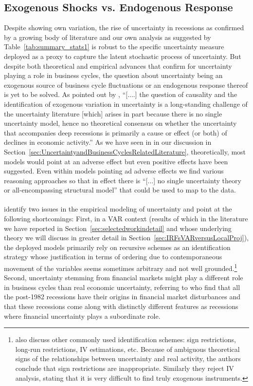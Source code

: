\documentclass[a4paper,11pt,listof=nochaptergap,oneside,pointednumbers,bibtotoc,bigheadings,liststotoc]{scrbook}
\theoremstyle{mysatz}
\theoremstyle{mydefinition}
\theoremstyle{mybemerkung}
\begin{document}
\subsection{Exogenous Shocks vs. Endogenous Response}
\label{sec:exoEndoJuradoetal}
Despite showing own variation, the rise of uncertainty in recessions as confirmed by a growing body of literature and our own analysis as suggested by Table~\ref{tab:summary_stats1} is robust to the specific uncertainty measure deployed as a proxy to capture the latent stochastic process of uncertainty. But despite both theoretical and empirical advances that confirm for uncertainty playing a role in business cycles, the question about uncertainty being an exogenous source of business cycle fluctuations or an endogenous response thereof is yet to be solved. As pointed out by \citet[p. 1]{ludvigsonetal:18}, ``[....] the question of causality and the identification of exogenous variation in uncertainty is a long-standing challenge of the uncertainty literature [which] arises in part because there is no single uncertainty model, hence no theoretical consensus on whether the uncertainty that accompanies deep recessions is primarily a cause or effect (or both) of declines in economic activity.'' As we have seen in in our discussion in Section~\ref{sec:UncertaintyandBusinessCyclesRelatedLiterature}, theoretically, most models would point at an adverse effect but even positive effects have been suggested. Even within models pointing ad adverse effects we find various reasoning approaches so that in effect there is ``[...] no single uncertainty theory or all-encompassing structural model'' \citep[p. 5]{ludvigsonetal:18} that could be used to map to the data.\\
\\
\citet{ludvigsonetal:18} identify two issues in the empirical modeling of uncertainty and point at the following shortcomings: First, in a VAR context (results of which in the literature we have reported in Section~\ref{sec:selectedworkindetail} and whose underlying theory we will discuss in greater detail in Section~\ref{sec:IRFsVARversusLocalProj}), the deployed models primarily rely on recursive schemes as an identification strategy whose justification in terms of ordering due to contemporaneous movement of the variables seems sometimes arbitrary and not well grounded.\footnote{\citet{ludvigsonetal:18} also discuss other commonly used identification schemes: sign restrictions, long-run restrictions, IV estimations, etc. Because of ambiguous theoretical signs of the relationships between uncertainty and real activity, the authors conclude that sign restrictions are inappropriate. Similarly they reject IV analysis, stating that it is very difficult to find truly exogenous instruments.} Second, uncertainty stemming from financial markets might play a different role in business cycles than real economic uncertainty, referring to \citet{ngandwright:13} who find that all the post-1982 recessions have their origins in financial market disturbances and that these recessions come along with distinctly different features as recessions where financial uncertainty plays a subordinate role.
\end{document}
